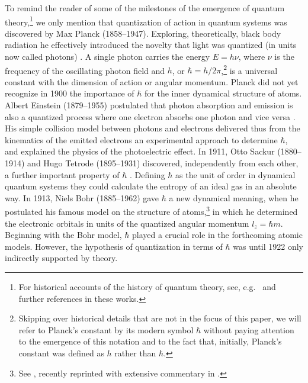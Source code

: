 \documentclass{article}
\begin{document}
To remind the reader of some of the milestones of the emergence of quantum theory,\footnote{For historical accounts of the history of quantum theory, see, e.g.\  \citep{KuhnT1978Theory, MehraJEtAl1982Development1,DarrigolO1992From,KraghH2012Bohr} and further references in these works.} we only mention that quantization of action in quantum systems was discovered by Max Planck (1858--1947). Exploring, theoretically, black body radiation he effectively introduced the novelty that light was quantized (in units now called photons) \citep{PlanckM1899Strahlungsvorgaenge}. A single photon carries the energy $E = h\nu$, where $\nu$ is the frequency of the oscillating photon field and $h$, or $\hbar = h/2\pi$,\footnote{Skipping over historical details that are not in the focus of this paper, we will refer to Planck's constant by its modern symbol $\hbar$ without paying attention to the emergence of this notation and to the fact that, initially, Planck's constant was defined as $h$ rather than $\hbar$.} is a universal constant with the dimension of action or angular momentum. Planck did not yet recognize in 1900 the importance of $\hbar$ for the inner dynamical structure of atoms. Albert Einstein (1879--1955) postulated that photon absorption and emission is also a quantized process where one electron absorbs one photon and vice versa \citep{Einstein1905i}. His simple collision model between photons and electrons delivered thus from the kinematics of the emitted electrons an experimental approach to determine $\hbar$, and explained the physics of the photoelectric effect. In 1911, Otto Sackur (1880--1914) and Hugo Tetrode (1895--1931) discovered, independently from each other, a further important property of $\hbar$ \citep{SackurO1912Anwendung,SackurO1913Bedeutung,TetrodeH1912Konstante1,TetrodeH1912Konstante2}. Defining $\hbar$ as the unit of order in dynamical quantum systems they could calculate the entropy of an ideal gas in an absolute way. In 1913, Niels Bohr (1885--1962) gave $\hbar$ a new dynamical meaning, when he postulated his famous model on the structure of atoms,\footnote{See \citep{BohrN1913Constitution1,BohrN1913Constitution2,BohrN1913Constitution3}, recently reprinted with extensive commentary in  \citep{AaserudFEtal2013Love}.} in which he determined the electronic orbitals in units of the quantized angular momentum $l_z=\hbar m$. Beginning with the Bohr model, $\hbar$ played a crucial role in the forthcoming atomic models. However, the hypothesis of quantization in terms of $\hbar$ was until 1922 only indirectly supported by theory.
\end{document}
